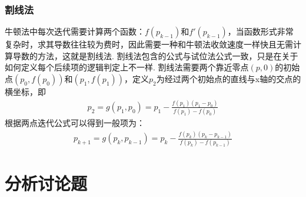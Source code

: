 \documentclass[UTF8]{ctexart}
\begin{document}
\subsubsection{割线法}
牛顿法中每次迭代需要计算两个函数：$f(p_{k-1})$和$f'(p_{k-1})$，当函数形式非常复杂时，求其导数往往较为费时，因此需要一种和牛顿法收敛速度一样快且无需计算导数的方法，这就是割线法.
割线法包含的公式与试位法公式一致，只是在关于如何定义每个后续项的逻辑判定上不一样.
割线法需要两个靠近零点$(p,0)$的初始点$(p_{0},f(p_{0}))$和$(p_{1},f(p_{1}))$，定义$p_{2}$为经过两个初始点的直线与x轴的交点的横坐标，即
\begin{align}
	p_{2}=g\left(p_{1}, p_{0}\right)=p_{1}-\frac{f\left(p_{1}\right)\left(p_{1}-p_{0}\right)}{f\left(p_{1}\right)-f\left(p_{0}\right)}
\end{align}
根据两点迭代公式可以得到一般项为：
\begin{align}
	p_{k+1}=g\left(p_{k}, p_{k-1}\right)=p_{k}-\frac{f\left(p_{k}\right)\left(p_{k}-p_{k-1}\right)}{f\left(p_{k}\right)-f\left(p_{k-1}\right)}
\end{align}

\section{分析讨论题}
\end{document}
